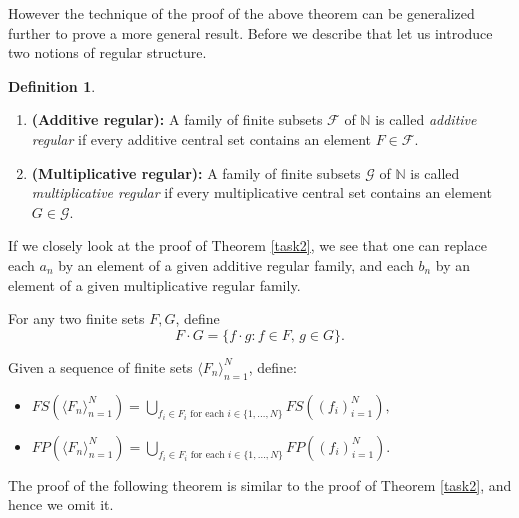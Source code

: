 \documentclass{article}
\theoremstyle{Theorem}
\theoremstyle{definition}
\newtheorem{defn}[thm]{Definition}
\newcommand{\N}{\mathbb{N}}
\newcommand{\F}{\mathcal{F}}
\newcommand{\G}{\mathcal{G}}
\begin{document}
However the technique of the proof of the above theorem can be generalized further to prove a more general result. Before we describe that let us introduce two notions of regular structure.
\begin{defn}\text{}\label{defn}
    \begin{enumerate}
    \item \textbf{(Additive regular):} A family of finite subsets $\F$ of $\N$ is called \textit{additive regular} if every additive central set contains an element $F\in \F.$

    \item \textbf{(Multiplicative regular):} A family of finite subsets $\G$ of $\N$ is called \textit{multiplicative regular} if every multiplicative central set contains an element $G\in \G.$
\end{enumerate}
\end{defn}

If we closely look at the proof of  Theorem \ref{task2}, we see that one can replace each $a_n$ by an element of a given additive regular family, and each $b_n$ by an element of a given multiplicative regular family. 

For any two finite sets $F,G$, define 
\[
F \cdot G = \{ f \cdot g : f \in F,\, g \in G \}.
\]

Given a sequence of finite sets $\langle F_n \rangle_{n=1}^N$, define:
\begin{itemize}
    \item $FS\left( \langle F_n \rangle_{n=1}^N \right) = \bigcup_{f_i \in F_i \text{ for each } i \in \{1, \ldots, N\}} FS\left( (f_i)_{i=1}^N \right),$
    \item $FP\left( \langle F_n \rangle_{n=1}^N \right) = \bigcup_{f_i \in F_i \text{ for each } i \in \{1, \ldots, N\}} FP\left( (f_i)_{i=1}^N \right).$
\end{itemize}

The proof of the following theorem is similar to the proof of Theorem \ref{task2}, and hence we omit it.
\end{document}
